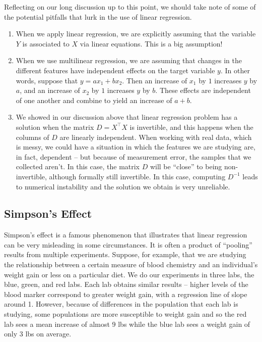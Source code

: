\documentclass[
  11pt,
  letterpaper,
]{scrbook}
\theoremstyle{plain}
\theoremstyle{plain}
\theoremstyle{remark}
\begin{document}
Reflecting on our long discussion up to this point, we should take note
of some of the potential pitfalls that lurk in the use of linear
regression.

\begin{enumerate}
\def\labelenumi{\arabic{enumi}.}
\item
  When we apply linear regression, we are explicitly assuming that the
  variable \(Y\) is associated to \(X\) via linear equations. This is a
  big assumption!
\item
  When we use multilinear regression, we are assuming that changes in
  the different features have independent effects on the target variable
  \(y\). In other words, suppose that \(y=ax_1+bx_2\). Then an increase
  of \(x_1\) by \(1\) increases \(y\) by \(a\), and an increase of
  \(x_2\) by \(1\) increases \(y\) by \(b\). These effects are
  independent of one another and combine to yield an increase of
  \(a+b\).
\item
  We showed in our discussion above that linear regression problem has a
  solution when the matrix \(D=X^{\intercal}X\) is invertible, and this
  happens when the columns of \(D\) are linearly independent. When
  working with real data, which is messy, we could have a situation in
  which the features we are studying are, in fact, dependent -- but
  because of measurement error, the samples that we collected aren't. In
  this case, the matrix \(D\) will be ``close'' to being non-invertible,
  although formally still invertible. In this case, computing \(D^{-1}\)
  leads to numerical instability and the solution we obtain is very
  unreliable.
\end{enumerate}

\hypertarget{simpsons-effect}{%
\subsection{Simpson's Effect}\label{simpsons-effect}}

Simpson's effect is a famous phenomenon that illustrates that linear
regression can be very misleading in some circumstances. It is often a
product of ``pooling'' results from multiple experiments. Suppose, for
example, that we are studying the relationship between a certain measure
of blood chemistry and an individual's weight gain or less on a
particular diet. We do our experiments in three labs, the blue, green,
and red labs. Each lab obtains similar results -- higher levels of the
blood marker correspond to greater weight gain, with a regression line
of slope around 1. However, because of differences in the population
that each lab is studying, some populations are more susceptible to
weight gain and so the red lab sees a mean increase of almost 9 lbs
while the blue lab sees a weight gain of only 3 lbs on average.
\end{document}
